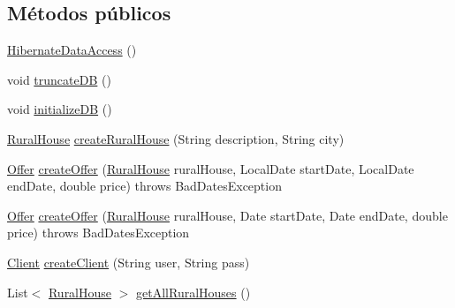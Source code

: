 \subsection*{Métodos públicos}
\begin{DoxyCompactItemize}
\item 
\mbox{\hyperlink{classcom_1_1ruralhousejsf_1_1data_access_1_1_hibernate_data_access_a8e0ec929d78d37a992837db0ba7e9602}{Hibernate\+Data\+Access}} ()
\item 
void \mbox{\hyperlink{classcom_1_1ruralhousejsf_1_1data_access_1_1_hibernate_data_access_a81a5e60db58acfc1a3c1de2f014813d5}{truncate\+DB}} ()
\item 
void \mbox{\hyperlink{classcom_1_1ruralhousejsf_1_1data_access_1_1_hibernate_data_access_af6f8016d5e185e86519871913781fe73}{initialize\+DB}} ()
\item 
\mbox{\hyperlink{classcom_1_1ruralhousejsf_1_1domain_1_1_rural_house}{Rural\+House}} \mbox{\hyperlink{classcom_1_1ruralhousejsf_1_1data_access_1_1_hibernate_data_access_a23eafc2c1f43052f2005a863d6592abc}{create\+Rural\+House}} (String description, String city)
\item 
\mbox{\hyperlink{classcom_1_1ruralhousejsf_1_1domain_1_1_offer}{Offer}} \mbox{\hyperlink{classcom_1_1ruralhousejsf_1_1data_access_1_1_hibernate_data_access_a332f591a06df13d36814ff215008987b}{create\+Offer}} (\mbox{\hyperlink{classcom_1_1ruralhousejsf_1_1domain_1_1_rural_house}{Rural\+House}} rural\+House, Local\+Date start\+Date, Local\+Date end\+Date, double price)  throws Bad\+Dates\+Exception 
\item 
\mbox{\hyperlink{classcom_1_1ruralhousejsf_1_1domain_1_1_offer}{Offer}} \mbox{\hyperlink{classcom_1_1ruralhousejsf_1_1data_access_1_1_hibernate_data_access_aeff0125a8998d3f3529028592a13efb0}{create\+Offer}} (\mbox{\hyperlink{classcom_1_1ruralhousejsf_1_1domain_1_1_rural_house}{Rural\+House}} rural\+House, Date start\+Date, Date end\+Date, double price)  throws Bad\+Dates\+Exception 
\item 
\mbox{\hyperlink{classcom_1_1ruralhousejsf_1_1domain_1_1_client}{Client}} \mbox{\hyperlink{classcom_1_1ruralhousejsf_1_1data_access_1_1_hibernate_data_access_ab1113c4a35f6f888d6bee15f25b117d5}{create\+Client}} (String user, String pass)
\item 
List$<$ \mbox{\hyperlink{classcom_1_1ruralhousejsf_1_1domain_1_1_rural_house}{Rural\+House}} $>$ \mbox{\hyperlink{classcom_1_1ruralhousejsf_1_1data_access_1_1_hibernate_data_access_acb92be47dc680218ff3102addce8ae8f}{get\+All\+Rural\+Houses}} ()
\item 

\end{DoxyCompactItemize}
